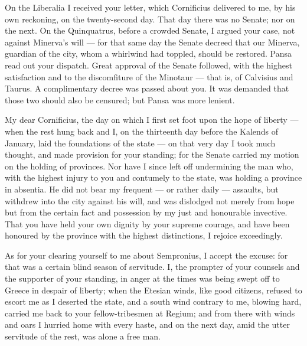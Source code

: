 

 On the Liberalia I received your letter, which Cornificius delivered to me, by his own reckoning, on the twenty-second day. That day there was no Senate; nor on the next. On the Quinquatrus, before a crowded Senate, I argued your case, not against Minerva's will --- for that same day the Senate decreed that our Minerva, guardian of the city, whom a whirlwind had toppled, should be restored. Pansa read out your dispatch. Great approval of the Senate followed, with the highest satisfaction and to the discomfiture of the Minotaur --- that is, of Calvisius and Taurus. A complimentary decree was passed about you. It was demanded that those two should also be censured; but Pansa was more lenient.

 My dear Cornificius, the day on which I first set foot upon the hope of liberty --- when the rest hung back and I, on the thirteenth day before the Kalends of January, laid the foundations of the state --- on that very day I took much thought, and made provision for your standing; for the Senate carried my motion on the holding of provinces. Nor have I since left off undermining the man who, with the highest injury to you and contumely to the state, was holding a province in absentia. He did not bear my frequent --- or rather daily --- assaults, but withdrew into the city against his will, and was dislodged not merely from hope but from the certain fact and possession by my just and honourable invective. That you have held your own dignity by your supreme courage, and have been honoured by the province with the highest distinctions, I rejoice exceedingly.

 As for your clearing yourself to me about Sempronius, I accept the excuse: for that was a certain blind season of servitude. I, the prompter of your counsels and the supporter of your standing, in anger at the times was being swept off to Greece in despair of liberty; when the Etesian winds, like good citizens, refused to escort me as I deserted the state, and a south wind contrary to me, blowing hard, carried me back to your fellow-tribesmen at Regium; and from there with winds and oars I hurried home with every haste, and on the next day, amid the utter servitude of the rest, was alone a free man.

